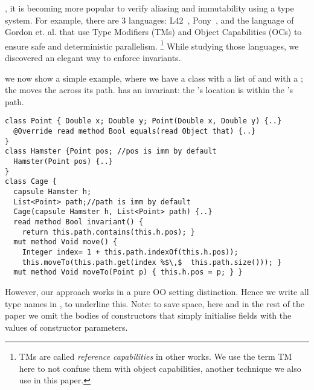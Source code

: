 , 
it is becoming more popular to verify aliasing and immutability using a type system.
For example, there are 3 languages: L42~\cite{ServettoZucca15,ServettoEtAl13a,JOT:issue_2011_01/article1,GianniniEtAl16}, Pony~\cite{clebsch2015deny,clebsch2017orca}, and the language of Gordon et. al.\cite{GordonEtAl12} that use Type Modifiers (TMs) and Object Capabilities (OCs) to ensure safe and deterministic parallelism.%
\footnote{TMs are called \emph{reference capabilities} in other works. We use the term TM here
to not confuse them with object capabilities, another technique we also use in this paper.}
While studying those languages, we discovered an elegant way to enforce invariants.


 we now show a simple example, where we have a \Q@Cage@ class with a list of \Q@Point@s \Q@path@ and \Q@Hamster@ with a \Q@Point@ \Q@pos@; the \Q@Cage@ moves the \Q@Hamster@ across its path. \Q@Cage@ has an invariant: the \Q@Hamster@'s location is within the \Q@Cage@'s path.


\begin{lstlisting}
class Point { Double x; Double y; Point(Double x, Double y) {..}
  @Override read method Bool equals(read Object that) {..} 
}
class Hamster {Point pos; //pos is imm by default
  Hamster(Point pos) {..} 
}
class Cage {
  capsule Hamster h;
  List<Point> path;//path is imm by default
  Cage(capsule Hamster h, List<Point> path) {..}
  read method Bool invariant() {
    return this.path.contains(this.h.pos); }
  mut method Void move() {
    Integer index= 1 + this.path.indexOf(this.h.pos));
    this.moveTo(this.path.get(index %$\,$  this.path.size())); }
  mut method Void moveTo(Point p) { this.h.pos = p; } }
\end{lstlisting}
However, our approach works in a pure OO setting distinction. Hence we write all type names in , to underline this. Note: to save space, here and in the rest of the paper we omit the bodies of constructors that simply initialise fields with the values of constructor parameters.

